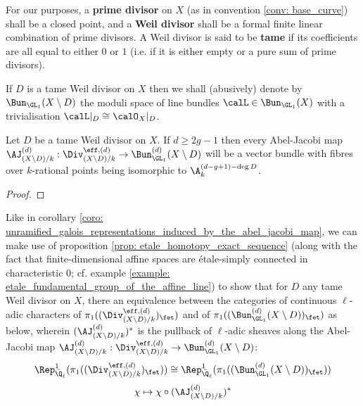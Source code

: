 \begin{definition} \label{def: prime_divisors_and_weil_divisors}
            For our purposes, a \textbf{prime divisor} on $X$ (as in convention \ref{conv: base_curve}) shall be a closed point, and a \textbf{Weil divisor} shall be a formal finite linear combination of prime divisors. A Weil divisor is said to be \textbf{tame} if its coefficients are all equal to either $0$ or $1$ (i.e. if it is either empty or a pure sum of prime divisors).
        \end{definition}
        \begin{convention} \label{conv: line_bundles_with_prescribed_trivialisations}
            If $D$ is a tame Weil divisor on $X$ then we shall (abusively) denote by $\Bun_{\GL_1}(X \setminus D)$ the moduli space of line bundles $\calL \in \Bun_{\GL_1}(X)$ with a trivialisation $\calL|_D \cong \calO_X|_D$.
        \end{convention}
        \begin{proposition} \label{prop: the_tamely_ramified_abel_jacobi_map_is_a_vector_bundle}
            Let $D$ be a tame Weil divisor on $X$. If $d \geq 2g - 1$ then every Abel-Jacobi map $\AJ_{(X \setminus D)/k}^{(d)}: \Div_{(X \setminus D)/k}^{\eff, (d)} \to \Bun_{\GL_1}^{(d)}(X \setminus D)$ will be a vector bundle with fibres over $k$-rational points being isomorphic to $\A^{(d - g + 1) - \deg D}_k$.
        \end{proposition}
            \begin{proof}
                
            \end{proof}
        \begin{corollary} \label{coro: tamely_ramified_galois_representations_induced_by_the_abel_jacobi_map}
            Like in corollary \ref{coro: unramified_galois_representations_induced_by_the_abel_jacobi_map}, we can make use of proposition \ref{prop: etale_homotopy_exact_sequence} (along with the fact that finite-dimensional affine spaces are \'etale-simply connected in characteristic $0$; cf. example \ref{example: etale_fundamental_group_of_the_affine_line}) to show that for $D$ any tame Weil divisor on $X$, there an equivalence between the categories of continuous $\ell$-adic characters of $\pi_1((\Div_{(X \setminus D)/k}^{\eff, (d)})_{\fet})$ and of $\pi_1((\Bun_{\GL_1}^{(d)}(X \setminus D))_{\fet})$ as below, wherein $(\AJ_{(X \setminus D)/k}^{(d)})^*$ is the pullback of $\ell$-adic sheaves along the Abel-Jacobi map $\AJ_{(X \setminus D)/k}^{(d)}: \Div_{(X \setminus D)/k}^{\eff, (d)} \to \Bun_{\GL_1}^{(d)}(X \setminus D)$:
                $$\Rep^1_{\bar{\Q}_{\ell}}(\pi_1((\Div_{(X \setminus D)/k}^{\eff, (d)})_{\fet})) \cong \Rep^1_{\bar{\Q}_{\ell}}(\pi_1((\Bun_{\GL_1}^{(d)}(X \setminus D))_{\fet}))$$
                $$\chi \mapsto \chi \circ (\AJ_{(X \setminus D)/k}^{(d)})^*$$
        \end{corollary}
        
